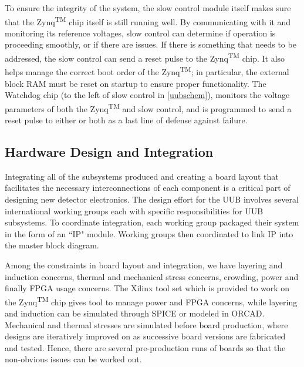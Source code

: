To ensure the integrity of the system, the slow control module itself makes sure that the Zynq\textsuperscript{TM} chip itself is still running well. By communicating with it and monitoring its reference voltages, slow control can determine if operation is proceeding smoothly, or if there are issues. If there is something that needs to be addressed, the slow control can send a reset pulse to the Zynq\textsuperscript{TM} chip. It also helps manage the correct boot order of the Zynq\textsuperscript{TM}; in particular, the external block RAM must be reset on startup to ensure proper functionality. The Watchdog chip (to the left of slow control in \autoref{uubschem}), monitors the voltage parameters of both the Zynq\textsuperscript{TM} and slow control, and is programmed to send a reset pulse to either or both as a last line of defense against failure.

\subsection{Hardware Design and Integration}
Integrating all of the subsystems produced and creating a board layout that facilitates the necessary interconnections of each component is a critical part of designing new detector electronics. The design effort for the UUB involves several international working groups each with specific responsibilities for UUB subsystems. To coordinate integration, each working group packaged their system in the form of an ``IP" module. Working groups then coordinated to link IP into the master block diagram.


Among the constraints in board layout and integration, we have layering and induction concerns, thermal and mechanical stress concerns, crowding, power and finally FPGA usage concerns. The Xilinx tool set which is provided to work on the Zynq\textsuperscript{TM} chip gives tool to manage power and FPGA concerns, while layering and induction can be simulated through SPICE or modeled in ORCAD. Mechanical and thermal stresses are simulated before board production, where designs are iteratively improved on as successive board versions are fabricated and tested. Hence, there are several pre-production runs of boards so that the non-obvious issues can be worked out. 

